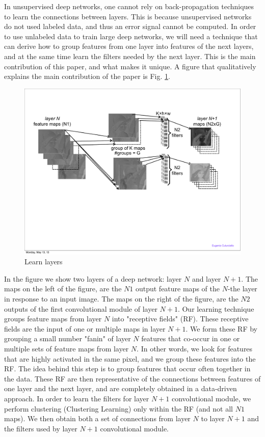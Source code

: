 \documentclass{article} %
\begin{document}
In unsupervised deep networks, one cannot rely on back-propagation techniques to learn the connections between layers. This is because unsupervised networks do not used labeled data, and thus an error signal cannot be computed.
In order to use unlabeled data to train large deep networks, we will need a technique that can derive how to group features from one layer into features of the next layers, and at the same time learn the filters needed by the next layer.
This is the main contribution of this paper, and what makes it unique. A figure that qualitatively explains the main contribution of the paper is Fig. \ref{fig-learnlayers}.

\begin{figure}
\includegraphics[width=5in]{fig-learnlayers.pdf}
\caption{Learn layers}
\label{fig-learnlayers}
\end{figure}

In the figure we show two layers of a deep network: layer $N$ and layer $N+1$. The maps on the left of the figure, are the $N1$ output feature maps of the $N$-the layer in response to an input image. The maps on the right of the figure, are the $N2$ outputs of the first convolutional module of layer $N+1$. 
Our learning technique groups feature maps from layer $N$ into "receptive fields" (RF). These receptive fields are the input of one or multiple maps in layer $N+1$. We form these RF by grouping a small number "fanin" of layer $N$ features that co-occur in one or multiple sets of feature maps from layer $N$. In other words, we look for features that are highly activated in the same pixel, and we group these features into the RF. The idea behind this step is to group features that occur often together in the data. These RF are then representative of the connections between features of one layer and the next layer, and are completely obtained in a data-driven approach.
In order to learn the filters for layer $N+1$ convolutional module, we perform clustering (Clustering Learning) only within the RF (and not all $N1$ maps). 
We then obtain both a set of connections from layer $N$ to layer $N+1$ and the filters used by layer $N+1$ convolutional module.
\end{document}
